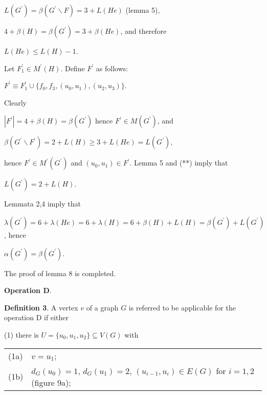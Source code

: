 \documentclass{article}
\begin{document}
\begin{center}
$L(G^{\prime })=\beta (G^{\prime }\backslash F)=3+L(He)$ (lemma 5),

$4+\beta (H)=\beta (G^{\prime })=3+\beta (He)$, and therefore

$L(He)\leq L(H)-1$.
\end{center}

Let $F_{1}^{\prime }\in M^{\prime }(H)$. Define $F^{\prime }$ as follows:

\begin{center}
$F^{\prime }\equiv F_{1}^{\prime }\cup
\{f_{0},f_{3},(u_{0},u_{1}),(u_{2},u_{3})\}$.
\end{center}

Clearly

\begin{center}
$\left\vert F^{\prime }\right\vert =4+\beta (H)=\beta (G^{\prime })$ hence $F^{\prime }\in M(G^{\prime })$, and

$\beta (G^{\prime }\backslash F^{\prime })=2+L(H)\geq 3+L(He)=L(G^{\prime })$,
\end{center}

hence $F^{\prime }\in M^{\prime }(G^{\prime })$ and $(u_{0},u_{1})\in
F^{\prime }$. Lemma 5 and (**) imply that

\begin{center}
$L(G^{\prime })=2+L(H)$.
\end{center}

Lemmata 2,4 imply that

\begin{center}
$\lambda (G^{\prime })=6+\lambda (He)=6+\lambda (H)=6+\beta (H)+L(H)=\beta
(G^{\prime })+L(G^{\prime })$, hence

$\alpha (G^{\prime })=\beta (G^{\prime })$.
\end{center}

The proof of lemma 8 is completed.

\bigskip

\textbf{Operation D}.

\textbf{Definition 3}. A vertex $v$ of a graph $G$ is referred to be
applicable for the operation D if either

(1) there is $U=\{u_{0},u_{1},u_{2}\}\subseteq V(G)$ with

\qquad 
\begin{tabular}{ll}
(1a) & $v=u_{1}$; \\ 
(1b) & $d_{G}(u_{0})=1$, $d_{G}(u_{1})=2$, $(u_{i-1},u_{i})\in E(G)$ for $i=1,2$ (figure 9a);\end{tabular}
\end{document}
